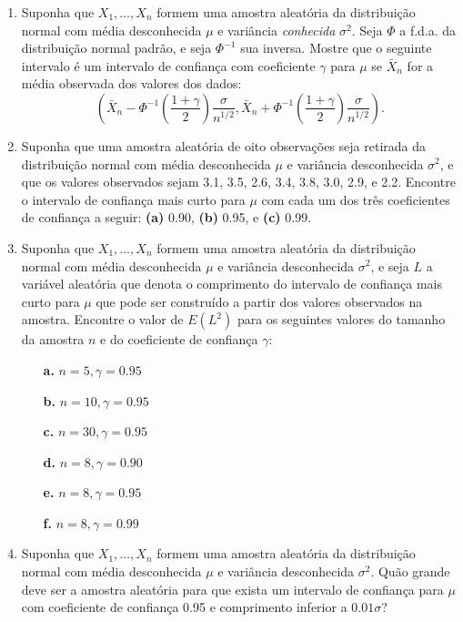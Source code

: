 \begin{enumerate}
    \item Suponha que $X_1, \dots, X_n$ formem uma amostra aleatória da distribuição normal com média desconhecida $\mu$ e variância \textit{conhecida} $\sigma^2$. Seja $\Phi$ a f.d.a. da distribuição normal padrão, e seja $\Phi^{-1}$ sua inversa. Mostre que o seguinte intervalo é um intervalo de confiança com coeficiente $\gamma$ para $\mu$ se $\bar{X}_n$ for a média observada dos valores dos dados:
    $$ \left(\bar{X}_n - \Phi^{-1}\left(\frac{1+\gamma}{2}\right)\frac{\sigma}{n^{1/2}}, \bar{X}_n + \Phi^{-1}\left(\frac{1+\gamma}{2}\right)\frac{\sigma}{n^{1/2}}\right). $$

    \item Suponha que uma amostra aleatória de oito observações seja retirada da distribuição normal com média desconhecida $\mu$ e variância desconhecida $\sigma^2$, e que os valores observados sejam 3.1, 3.5, 2.6, 3.4, 3.8, 3.0, 2.9, e 2.2. Encontre o intervalo de confiança mais curto para $\mu$ com cada um dos três coeficientes de confiança a seguir: \textbf{(a)} 0.90, \textbf{(b)} 0.95, e \textbf{(c)} 0.99.

    \item Suponha que $X_1, \dots, X_n$ formem uma amostra aleatória da distribuição normal com média desconhecida $\mu$ e variância desconhecida $\sigma^2$, e seja $L$ a variável aleatória que denota o comprimento do intervalo de confiança mais curto para $\mu$ que pode ser construído a partir dos valores observados na amostra. Encontre o valor de $E(L^2)$ para os seguintes valores do tamanho da amostra $n$ e do coeficiente de confiança $\gamma$:
    \begin{itemize}
        \item[\textbf{a.}] $n=5, \gamma=0.95$
        \item[\textbf{b.}] $n=10, \gamma=0.95$
        \item[\textbf{c.}] $n=30, \gamma=0.95$
        \item[\textbf{d.}] $n=8, \gamma=0.90$
        \item[\textbf{e.}] $n=8, \gamma=0.95$
        \item[\textbf{f.}] $n=8, \gamma=0.99$
    \end{itemize}

    \item Suponha que $X_1, \dots, X_n$ formem uma amostra aleatória da distribuição normal com média desconhecida $\mu$ e variância desconhecida $\sigma^2$. Quão grande deve ser a amostra aleatória para que exista um intervalo de confiança para $\mu$ com coeficiente de confiança 0.95 e comprimento inferior a $0.01\sigma$?
\end{enumerate}

